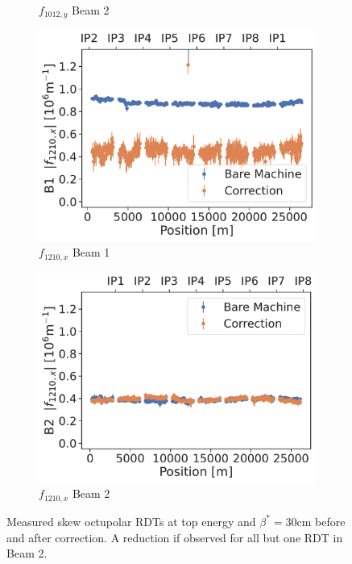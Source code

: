 \begin{figure}[!htb]
\begin{subfigure}{0.49\textwidth}
        \caption{$f_{1012,y}$ Beam 2}
    \end{subfigure}
    \par\bigskip 
    \begin{subfigure}{0.49\textwidth}
        \includegraphics[width=\textwidth]{./images/f1210_b1.pdf}
        \caption{$f_{1210,x}$ Beam 1}
    \end{subfigure}
    \hfill
    \begin{subfigure}{0.49\textwidth}
        \includegraphics[width=\textwidth]{./images/f1210_b2.pdf}
        \caption{$f_{1210,x}$ Beam 2}
    \end{subfigure}
    \caption{Measured skew octupolar RDTs at top energy and $\beta^*=30\text{cm}$ before and after
    correction. A reduction if observed for all but one RDT in Beam 2.} 
    \label{fig:skew_octupolar:corrections_vs_bare}
\end{figure}


